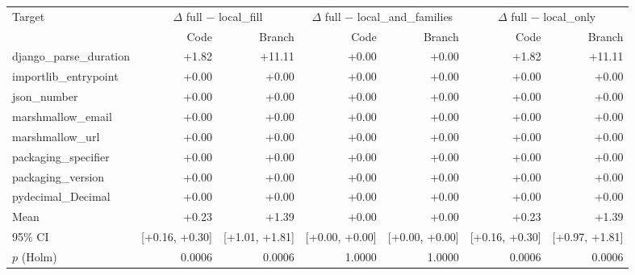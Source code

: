 \begin{tabular}{lrrrrrr}
\toprule
Target & \multicolumn{2}{c}{$\Delta$ full $-$ local\_fill} & \multicolumn{2}{c}{$\Delta$ full $-$ local\_and\_families} & \multicolumn{2}{c}{$\Delta$ full $-$ local\_only} \\
 & Code & Branch & Code & Branch & Code & Branch \\
\midrule
django\_parse\_duration & +1.82 & +11.11 & +0.00 & +0.00 & +1.82 & +11.11 \\
importlib\_entrypoint & +0.00 & +0.00 & +0.00 & +0.00 & +0.00 & +0.00 \\
json\_number & +0.00 & +0.00 & +0.00 & +0.00 & +0.00 & +0.00 \\
marshmallow\_email & +0.00 & +0.00 & +0.00 & +0.00 & +0.00 & +0.00 \\
marshmallow\_url & +0.00 & +0.00 & +0.00 & +0.00 & +0.00 & +0.00 \\
packaging\_specifier & +0.00 & +0.00 & +0.00 & +0.00 & +0.00 & +0.00 \\
packaging\_version & +0.00 & +0.00 & +0.00 & +0.00 & +0.00 & +0.00 \\
pydecimal\_Decimal & +0.00 & +0.00 & +0.00 & +0.00 & +0.00 & +0.00 \\
\midrule
Mean & +0.23 & +1.39 & +0.00 & +0.00 & +0.23 & +1.39 \\
95\% CI & [+0.16, +0.30] & [+1.01, +1.81] & [+0.00, +0.00] & [+0.00, +0.00] & [+0.16, +0.30] & [+0.97, +1.81] \\
$p$ (Holm) & 0.0006 & 0.0006 & 1.0000 & 1.0000 & 0.0006 & 0.0006 \\
\bottomrule
\end{tabular}
